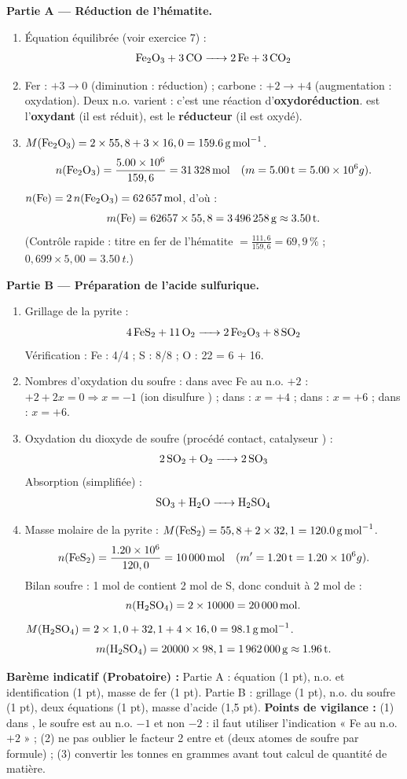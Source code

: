 \documentclass[11pt]{article}
\begin{document}
\begin{corrige}
\textbf{Partie A — Réduction de l'hématite.}
\begin{enumerate}
\item Équation équilibrée (voir exercice 7) :
\[ \ce{Fe2O3 + 3 CO -> 2 Fe + 3 CO2} \]
\item Fer : $+3 \to 0$ (diminution : réduction) ; carbone : $+2 \to +4$ (augmentation : oxydation). Deux n.o. varient : c'est une réaction d'\textbf{oxydoréduction}.  est l'\textbf{oxydant} (il est réduit),  est le \textbf{réducteur} (il est oxydé).
\item $M(\ce{Fe2O3}) = 2 \times 55,8 + 3 \times 16,0 = \SI{159,6}{g.mol^{-1}}$.
\[ n(\ce{Fe2O3}) = \dfrac{\num{5,00e6}}{159,6} = \SI{31328}{mol} \quad (m = \SI{5,00}{t} = \num{5,00e6}{g}). \]
$n(\ce{Fe}) = 2\,n(\ce{Fe2O3}) = \SI{62657}{mol}$, d'où :
\[ m(\ce{Fe}) = 62657 \times 55,8 = \SI{3496258}{g} \approx \SI{3,50}{t}. \]
(Contrôle rapide : titre en fer de l'hématite $= \frac{111,6}{159,6} = 69,9\,\%$ ; $0,699 \times 5,00 = \SI{3,50}{t}$.)
\end{enumerate}
\textbf{Partie B — Préparation de l'acide sulfurique.}
\begin{enumerate}
\item Grillage de la pyrite :
\[ \ce{4 FeS2 + 11 O2 -> 2 Fe2O3 + 8 SO2} \]
Vérification : Fe : 4/4 ; S : 8/8 ; O : 22 = 6 + 16.
\item Nombres d'oxydation du soufre : dans  avec Fe au n.o. $+2$ : $+2 + 2x = 0 \Rightarrow x = -1$ (ion disulfure ) ; dans  : $x = +4$ ; dans  : $x = +6$ ; dans  : $x = +6$.
\item Oxydation du dioxyde de soufre (procédé contact, catalyseur ) :
\[ \ce{2 SO2 + O2 -> 2 SO3} \]
Absorption (simplifiée) :
\[ \ce{SO3 + H2O -> H2SO4} \]
\item Masse molaire de la pyrite : $M(\ce{FeS2}) = 55,8 + 2 \times 32,1 = \SI{120,0}{g.mol^{-1}}$.
\[ n(\ce{FeS2}) = \dfrac{\num{1,20e6}}{120,0} = \SI{10000}{mol} \quad (m' = \SI{1,20}{t} = \num{1,20e6}{g}). \]
Bilan soufre : 1 mol de  contient 2 mol de S, donc conduit à 2 mol de  :
\[ n(\ce{H2SO4}) = 2 \times 10000 = \SI{20000}{mol}. \]
$M(\ce{H2SO4}) = 2 \times 1,0 + 32,1 + 4 \times 16,0 = \SI{98,1}{g.mol^{-1}}$.
\[ m(\ce{H2SO4}) = 20000 \times 98,1 = \SI{1962000}{g} \approx \SI{1,96}{t}. \]
\end{enumerate}
\textbf{Barème indicatif (Probatoire) :} Partie A : équation (1 pt), n.o. et identification (1 pt), masse de fer (1 pt). Partie B : grillage (1 pt), n.o. du soufre (1 pt), deux équations (1 pt), masse d'acide (1,5 pt).
\textbf{Points de vigilance :} (1) dans , le soufre est au n.o. $-1$ et non $-2$ : il faut utiliser l'indication « Fe au n.o. $+2$ » ; (2) ne pas oublier le facteur 2 entre  et  (deux atomes de soufre par formule) ; (3) convertir les tonnes en grammes avant tout calcul de quantité de matière.
\end{corrige}
\end{document}

